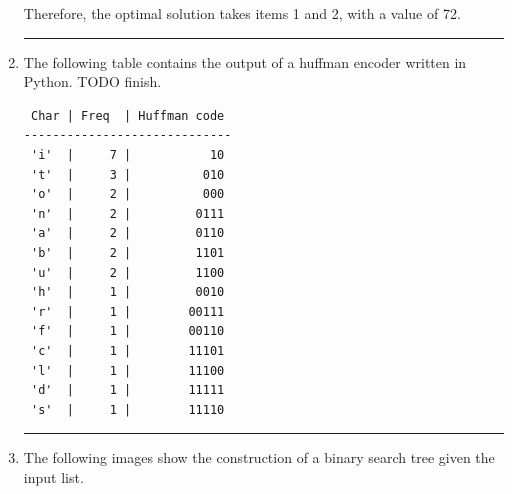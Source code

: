 \documentclass{article}
\begin{document}
\begin{enumerate}
Therefore, the optimal solution takes items 1 and 2, with a value of 72. 

\noindent\rule{8cm}{0.4pt}

\item The following table contains the output of a huffman encoder written in Python. TODO finish.
\begin{lstlisting}
 Char | Freq  | Huffman code
-----------------------------
 'i'  |     7 |           10
 't'  |     3 |          010
 'o'  |     2 |          000
 'n'  |     2 |         0111
 'a'  |     2 |         0110
 'b'  |     2 |         1101
 'u'  |     2 |         1100
 'h'  |     1 |         0010
 'r'  |     1 |        00111
 'f'  |     1 |        00110
 'c'  |     1 |        11101
 'l'  |     1 |        11100
 'd'  |     1 |        11111
 's'  |     1 |        11110

\end{lstlisting}

\noindent\rule{8cm}{0.4pt}


\item 
The following images show the construction of a binary search tree given the input list. 


\end{enumerate}
\end{document}

